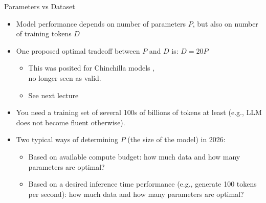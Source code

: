 \documentclass[11pt,compress,t,notes=noshow, xcolor=table]{beamer}
\begin{document}
\begin{vbframe}{Parameters vs Dataset}

\vfill

\begin{itemize}
    \item Model performance depends on number of parameters $P$, but also on number of training tokens $D$
	\item One proposed optimal tradeoff between $P$ and $D$ is: $D = 20 P$
	\begin{itemize}
	    \item This was posited for Chinchilla
	models ,\\
        no longer seen as valid.
        \item See next lecture
	\end{itemize}
      \item
You need a training set of several 100s of billions of
tokens at least (e.g., LLM does not
          become fluent otherwise).
        \item
Two typical ways of determining $P$ (the size of the model)
in 2026:
\begin{itemize}
\item Based on available compute budget: how much data and
  how many parameters are optimal?
  \item Based on a desired inference time performance
    (e.g., generate 100 tokens per second): how much data and how many parameters are optimal?

\end{itemize}
\end{itemize}

\vfill

\end{vbframe}

\end{document}
